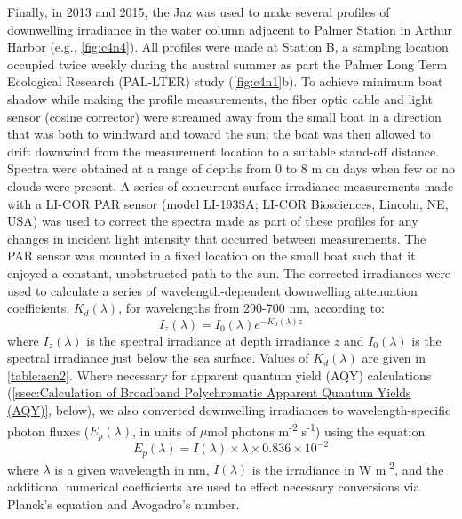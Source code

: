 Finally, in 2013 and 2015, the Jaz was used to make several profiles of downwelling irradiance in the water column adjacent to Palmer Station in Arthur Harbor (e.g., \autoref{fig:c4n4}). All profiles were made at Station B, a sampling location occupied twice weekly during the austral summer as part the Palmer Long Term Ecological Research (PAL-LTER) study (\autoref{fig:c4n1}b). To achieve minimum boat shadow while making the profile measurements, the fiber optic cable and light sensor (cosine corrector) were streamed away from the small boat in a direction that was both to windward and toward the sun; the boat was then allowed to drift downwind from the measurement location to a suitable stand-off distance. Spectra were obtained at a range of depths from 0 to 8 m on days when few or no clouds were present. A series of concurrent surface irradiance measurements made with a LI-COR PAR sensor (model LI-193SA; LI-COR Biosciences, Lincoln, NE, USA) was used to correct the spectra made as part of these profiles for any changes in incident light intensity that occurred between measurements. The PAR sensor was mounted in a fixed location on the small boat such that it enjoyed a constant, unobstructed path to the sun. The corrected irradiances were used to calculate a series of wavelength-dependent downwelling attenuation coefficients, ${K_d}(\lambda )$, for wavelengths from 290-700 nm, according to:
\begin{equation} \label{eq:c4e1}
{I_z}(\lambda ) = {I_0}(\lambda ){e^{ - {K_d}(\lambda )z}}
\end{equation}
where ${I_z}(\lambda )$ is the spectral irradiance at depth irradiance $z$ and ${I_0}(\lambda )$ is the spectral irradiance just below the sea surface. Values of ${K_d}(\lambda )$ are given in \autoref{table:aen2}. Where necessary for apparent quantum yield (AQY) calculations (\autoref{ssec:Calculation of Broadband Polychromatic Apparent Quantum Yields (AQY)}, below), we also converted downwelling irradiances to wavelength-specific photon fluxes (${E_p}(\lambda )$, in units of $\mu$mol photons m\textsuperscript{-2} s\textsuperscript{-1}) using the equation
\begin{equation} \label{eq:c4e2}
{E_p}(\lambda ) = I(\lambda ) \times \lambda  \times 0.836 \times {10^{ - 2}}
\end{equation}
where $\lambda$ is a given wavelength in nm, ${I}(\lambda )$ is the irradiance in W m\textsuperscript{-2}, and the additional numerical coefficients are used to effect necessary conversions via Planck's equation and Avogadro's number.
